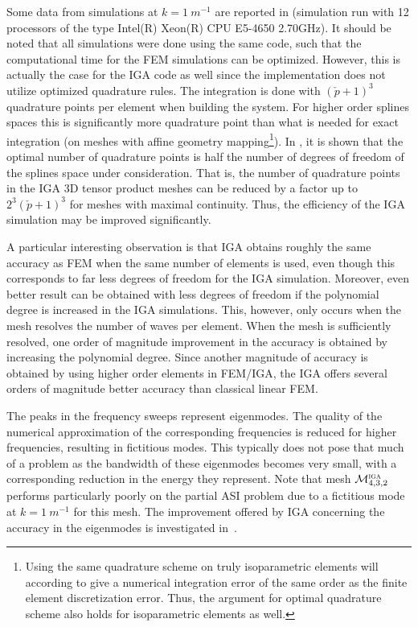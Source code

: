 Some data from simulations at $k=\SI{1}{m^{-1}}$ are reported in  (simulation run with 12 processors of the type Intel(R) Xeon(R) CPU E5-4650 2.70GHz). It should be noted that all simulations were done using the same code, such that the computational time for the FEM simulations can be optimized. However, this is actually the case for the IGA code as well since the implementation does not utilize optimized quadrature rules. The integration is done with $(\check{p}+1)^3$ quadrature points per element when building the system. For higher order splines spaces this is significantly more quadrature point than what is needed for exact integration (on meshes with affine geometry mapping\footnote{Using the same quadrature scheme on truly isoparametric elements will according to \cite[p. 256]{Ciarlet1991bee} give a numerical integration error of the same order as the finite element discretization error. Thus, the argument for optimal quadrature scheme also holds for isoparametric elements as well.}). In \cite{Hughes2010eqf,Johannessen2017oqf}, it is shown that the optimal number of quadrature points is half the number of degrees of freedom of the splines space under consideration. That is, the number of quadrature points in the IGA 3D tensor product meshes can be reduced by a factor up to $2^3(\check{p}+1)^3$ for meshes with maximal continuity. Thus, the efficiency of the IGA simulation may be improved significantly.

A particular interesting observation is that IGA obtains roughly the same accuracy as FEM when the same number of elements is used, even though this corresponds to far less degrees of freedom for the IGA simulation. Moreover, even better result can be obtained with less degrees of freedom if the polynomial degree is increased in the IGA simulations. This, however, only occurs when the mesh resolves the number of waves per element. When the mesh is sufficiently resolved, one order of magnitude improvement in the accuracy is obtained by increasing the polynomial degree. Since another magnitude of accuracy is obtained by using higher order elements in FEM/IGA, the IGA offers several orders of magnitude better accuracy than classical linear FEM. 

The peaks in the frequency sweeps represent eigenmodes. The quality of the numerical approximation of the corresponding frequencies is reduced for higher frequencies, resulting in fictitious modes. This typically does not pose that much of a problem as the bandwidth of these eigenmodes becomes very small, with a corresponding reduction in the energy they represent. Note that mesh ${\cal M}_{4,3,2}^{\textsc{iga}}$ performs particularly poorly on the partial ASI problem due to a fictitious mode at $k=\SI{1}{m^{-1}}$ for this mesh. The improvement offered by IGA concerning the accuracy in the eigenmodes is investigated in~\cite{Venas2015iao}. 

